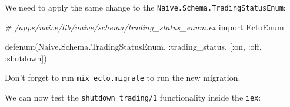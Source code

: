 \documentclass[
  oneside]{book}
\newenvironment{Shaded}{\begin{snugshade}}{\end{snugshade}}
\newcommand{\CommentTok}[1]{\textcolor[rgb]{0.56,0.35,0.01}{\textit{#1}}}
\newcommand{\ConstantTok}[1]{\textcolor[rgb]{0.00,0.00,0.00}{#1}}
\newcommand{\ImportTok}[1]{#1}
\newcommand{\NormalTok}[1]{#1}
\newcommand{\OperatorTok}[1]{\textcolor[rgb]{0.81,0.36,0.00}{\textbf{#1}}}
\newcommand{\VariableTok}[1]{\textcolor[rgb]{0.00,0.00,0.00}{#1}}
\begin{document}
We need to apply the same change to the \texttt{Naive.Schema.TradingStatusEnum}:

\begin{Shaded}
\begin{Highlighting}[]
\CommentTok{\# /apps/naive/lib/naive/schema/trading\_status\_enum.ex}
\ImportTok{import} \ConstantTok{EctoEnum}

\NormalTok{defenum(}\ConstantTok{Naive}\OperatorTok{.}\ConstantTok{Schema}\OperatorTok{.}\ConstantTok{TradingStatusEnum}\NormalTok{, }\VariableTok{:trading\_status}\NormalTok{, [}\VariableTok{:on}\NormalTok{, }\VariableTok{:off}\NormalTok{, }\VariableTok{:shutdown}\NormalTok{])}
\end{Highlighting}
\end{Shaded}

Don't forget to run \texttt{mix\ ecto.migrate} to run the new migration.

We can now test the \texttt{shutdown\_trading/1} functionality inside the \texttt{iex}:
\end{document}
